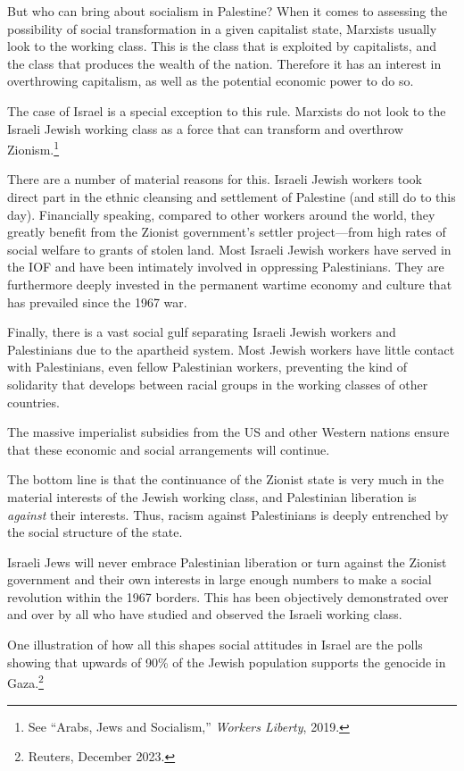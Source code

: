 But who can bring about socialism in Palestine? When it comes to assessing the possibility of social transformation in a given capitalist state, Marxists usually look to the working class. This is the class that is exploited by capitalists, and the class that produces the wealth of the nation. Therefore it has an interest in overthrowing capitalism, as well as the potential economic power to do so.

The case of Israel is a special exception to this rule. Marxists do not look to the Israeli Jewish working class as a force that can transform and overthrow Zionism.\footnote{See ``Arabs, Jews and Socialism,'' \emph{Workers Liberty}, 2019.}

There are a number of material reasons for this. Israeli Jewish workers took direct part in the ethnic cleansing and settlement of Palestine (and still do to this day). Financially speaking, compared to other workers around the world, they greatly benefit from the Zionist government's settler project---from high rates of social welfare to grants of stolen land. Most Israeli Jewish workers have served in the IOF and have been intimately involved in oppressing Palestinians. They are furthermore deeply invested in the permanent wartime economy and culture that has prevailed since the 1967 war.

Finally, there is a vast social gulf separating Israeli Jewish workers and Palestinians due to the apartheid system. Most Jewish workers have little contact with Palestinians, even fellow Palestinian workers, preventing the kind of solidarity that develops between racial groups in the working classes of other countries.

The massive imperialist subsidies from the US and other Western nations ensure that these economic and social arrangements will continue.

The bottom line is that the continuance of the Zionist state is very much in the material interests of the Jewish working class, and Palestinian liberation is \emph{against} their interests. Thus, racism against Palestinians is deeply entrenched by the social structure of the state.

Israeli Jews will never embrace Palestinian liberation or turn against the Zionist government and their own interests in large enough numbers to make a social revolution within the 1967 borders. This has been objectively demonstrated over and over by all who have studied and observed the Israeli working class.

One illustration of how all this shapes social attitudes in Israel are the polls showing that upwards of 90\% of the Jewish population supports the genocide in Gaza.\footnote{Reuters, December 2023.}

